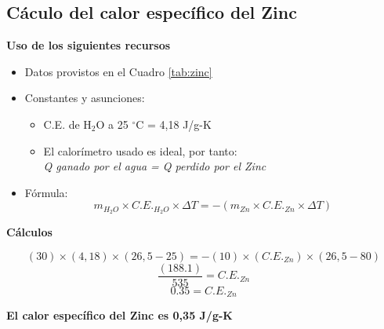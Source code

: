 \documentclass[10pt]{article}
\begin{document}
\subsection{Cáculo del calor específico del Zinc}
\vspace{2mm}
\textbf{Uso de los siguientes recursos}
    \begin{itemize}
        \item Datos provistos en el Cuadro \ref{tab:zinc}
        \item Constantes y asunciones:
        \begin{itemize}
            \item C.E. de H$_{2}$O a 25 $^\circ$C = 4,18 J/g-K
            \item El calorímetro usado es ideal, por tanto:\\ 
                    \emph{Q ganado por el agua = Q perdido por el Zinc}
        \end{itemize}
        \item Fórmula:
        \begin{equation}
            m_{H_{2}O}\times C.E._{H_{2}O} \times\Delta T = -(m_{Zn} \times C.E._{Zn} \times\Delta T)
        \end{equation}
    \end{itemize}
\vspace{2mm}
\hspace{0.5cm}\textbf{Cálculos}

\begin{equation*}
            (30)\times(4,18)\times(26,5-25) = -(10)\times (C.E._{Zn})\times(26,5-80)
        \end{equation*}
 \vspace{0.1cm}       
\begin{equation*}
            \frac{(188.1)}{535}=C.E._{Zn}
        \end{equation*}
\vspace{0.1cm}
\begin{equation*}
            0.35=C.E._{Zn}
        \end{equation*}

\begin{center}
    \textbf{El calor específico del Zinc es 0,35 J/g-K}
\end{center}
\enskip
\end{document}
